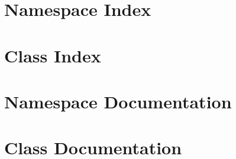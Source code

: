 \documentclass[twoside]{book}
\newcommand{\+}{\discretionary{\mbox{\scriptsize$\hookleftarrow$}}{}{}}
\newcommand{\clearemptydoublepage}{%
  \newpage{\pagestyle{empty}\cleardoublepage}%
}
\begin{document}
\chapter{Namespace Index}

\chapter{Class Index}

\chapter{Namespace Documentation}












\chapter{Class Documentation}


\backmatter
\newpage
{}
\clearemptydoublepage
{}
\printindex
\end{document}
